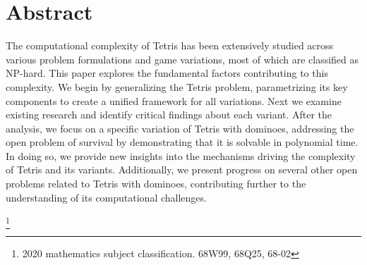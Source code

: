 \section*{Abstract}

The computational complexity of Tetris has been extensively studied across various problem formulations and game variations, most of which are classified as NP-hard. This paper explores the fundamental factors contributing to this complexity. We begin by generalizing the Tetris problem, parametrizing its key components to create a unified framework for all variations. Next we examine existing research and identify critical findings about each variant. After the analysis, we focus on a specific variation of Tetris with dominoes, addressing the open problem of survival by demonstrating that it is solvable in polynomial time. In doing so, we provide new insights into the mechanisms driving the complexity of Tetris and its variants. Additionally, we present progress on several other open problems related to Tetris with dominoes, contributing further to the understanding of its computational challenges.

{\let\thefootnote\relax\footnote{2020 mathematics subject classification. 68W99, 68Q25, 68-02}}

